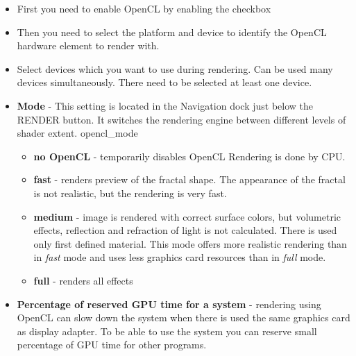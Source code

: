 \begin{itemize}
	\item First you need to enable OpenCL by enabling the checkbox
	
	\item Then you need to select the platform and device to identify the OpenCL hardware 
		element to render with.
		
	\item Select devices which you want to use during rendering. Can be used many devices simultaneously. There need to be selected at least one device.
	\item \textbf{Mode} - This setting is located in the Navigation dock just below the RENDER button. It switches the rendering engine between different levels of shader extent.
	{opencl_mode}
\begin{itemize}
	\item  \textbf{no OpenCL} - temporarily disables OpenCL  Rendering is done by CPU.
	\item  \textbf{fast} - renders preview of the fractal shape. The appearance of the fractal is not realistic, but the rendering is very fast.
	\item  \textbf{medium} - image is rendered with correct surface colors, but volumetric effects, reflection and refraction of light is not calculated. There is used only first defined material. This mode offers more realistic rendering than in \emph{fast} mode and uses less graphics card resources than in \emph{full} mode. 
	\item  \textbf{full} - renders all effects	
\end{itemize}

	\item \textbf{Percentage of reserved GPU time for a system} - rendering using OpenCL can slow down the system when there is used the same graphics card as display adapter. To be able to use the system you can reserve small percentage of GPU time for other programs.
	

\end{itemize}
